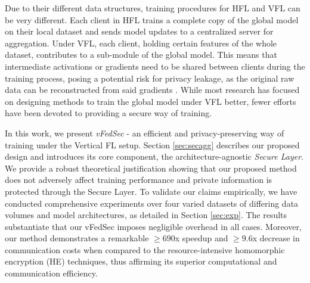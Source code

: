 \documentclass[withindex,glossary,firstyr]{cam-thesis}
\begin{document}
Due to their different data structures, training procedures for HFL and VFL can be very different. Each client in HFL trains a complete copy of the global model on their local dataset and sends model updates to a centralized server for aggregation. Under VFL,  each client, holding certain features of the whole dataset, contributes to a sub-module of the global model. This means that intermediate activations or gradients need to be shared between clients during the training process, posing a potential risk for privacy leakage, as the original raw data can be reconstructed from said gradients \citep{dlg, idlg, jin2021cafe,yin2021see}. While most research has focused on designing methods to train the global model under VFL better, fewer efforts have been devoted to providing a secure way of training. %



In this work, we present \emph{vFedSec} - an efficient and privacy-preserving way of training under the Vertical FL setup. %
Section \ref{sec:secagg} describes our proposed design and introduces its core component, the architecture-agnostic \emph{Secure Layer}.
We provide a robust theoretical justification showing that our proposed method does not adversely affect training performance and private information is protected through the Secure Layer. To validate our claims empirically, we have conducted comprehensive experiments over four varied datasets of differing data volumes and model architectures, as detailed in Section \ref{sec:exp}. The results substantiate that our vFedSec imposes negligible overhead in all cases. Moreover, our method demonstrates a remarkable $\geq 690$x speedup and $\geq 9.6$x decrease in communication costs when compared to the resource-intensive homomorphic encryption (HE) techniques, thus affirming its superior computational and communication efficiency. %
\end{document}
